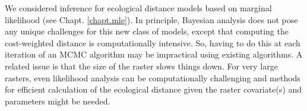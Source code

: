 We considered inference for ecological distance models based on
marginal likelihood \citep{borchers_efford:2008}
(see Chapt. \ref{chapt.mle}).
In principle,
Bayesian analysis does not pose any unique challenges for this new
class of models, except that computing the cost-weighted distance is
computationally intensive.  So, having to do this at each iteration of
an MCMC algorithm may be impractical using existing algorithms.  A
related issue is that the size of the raster slows things down. For
very large rasters, even likelihood analysis can be computationally
challenging and methods for efficient calculation of the ecological
distance given the raster covariate(s) and parameters might be needed.





























